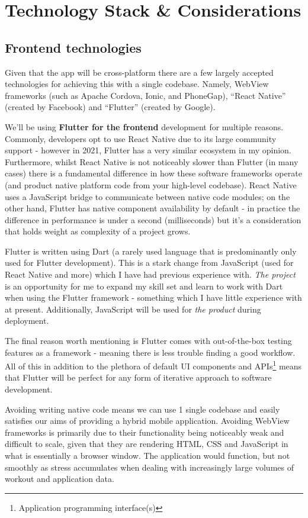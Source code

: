 \section{Technology Stack \& Considerations}
\label{sec:tech-stack}
\vspace{-3mm}
\subsection{Frontend technologies}
\vspace{-3mm}
Given that the app will be cross-platform there are
a few largely accepted technologies for achieving this with a single codebase.
Namely, WebView frameworks (such as Apache Cordova, Ionic, and PhoneGap),
``React Native'' (created by Facebook) and ``Flutter'' (created by Google). 
\par
We'll be using \textbf{Flutter for the frontend} development for multiple reasons.
Commonly, developers opt to use React Native due to its large
community support - however in 2021, Flutter has a very similar ecosystem in my opinion.
Furthermore, whilst React Native is not noticeably slower than Flutter (in many cases) there is a fundamental
difference in how these software frameworks operate (and product native platform code from your high-level codebase).
React Native uses a JavaScript bridge to communicate between native code modules; on the other hand,
Flutter has native component availability by default - in practice the difference in performance is under
a second (milliseconds) but it's a consideration that holds weight as complexity of a project grows.
\par
Flutter is written using Dart (a rarely used language that is predominantly only used for Flutter development).
This is a stark change from JavaScript (used for React Native and more) which I have had previous experience with.
\textit{The project} is an opportunity for me to expand my skill set and learn to work with Dart when using
the Flutter framework - something which I have little experience with at present. Additionally,
JavaScript will be used for \textit{the product} during deployment.
\par
The final reason worth mentioning is Flutter comes with out-of-the-box testing features
as a framework - meaning there is less trouble finding a good workflow.
All of this in addition to the plethora of default UI components and APIs\footnote{Application programming interface(s)} means
that Flutter will be perfect for any form of iterative approach 
to software development.
\par
Avoiding writing native code means we can use 1 single codebase and 
easily satisfies our aims of providing a hybrid mobile application.
Avoiding WebView frameworks is primarily due to their functionality being noticeably
weak and difficult to scale, given that they are rendering HTML, CSS 
and JavaScript in what is essentially a browser window. The application would function,
but not smoothly as stress accumulates when dealing with increasingly large
volumes of workout and application data.

